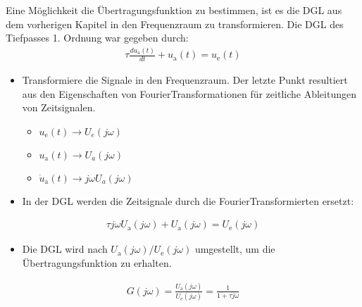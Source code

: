 \documentclass[letterpaper,10pt,english]{jupyterBook}
\begin{document}
\sphinxAtStartPar
{} Eine Möglichkeit die Übertragungsfunktion zu bestimmen, ist es die DGL aus dem vorherigen Kapitel in den Frequenzraum zu transformieren. Die DGL des Tiefpasses 1. Ordnung war gegeben durch:
\begin{equation*}
\begin{split}\tau \frac{du_\mathrm a (t)}{dt} + u_\mathrm a (t) = u_\mathrm e (t)\end{split}
\end{equation*}\begin{itemize}
\item {} 
\sphinxAtStartPar
Transformiere die Signale in den Frequenzraum. Der letzte Punkt resultiert aus den Eigenschaften von Fourier\sphinxhyphen{}Transformationen für zeitliche Ableitungen von Zeitsignalen.
\begin{itemize}
\item {} 
\sphinxAtStartPar
\(u_\mathrm e (t) \rightarrow U_e(j \omega)\)

\item {} 
\sphinxAtStartPar
\(u_\mathrm a (t) \rightarrow U_a(j \omega)\)

\item {} 
\sphinxAtStartPar
\(\dot u_\mathrm a (t) \rightarrow j \omega U_a(j \omega)\)

\end{itemize}

\item {} 
\sphinxAtStartPar
In der DGL werden die Zeitsignale durch die Fourier\sphinxhyphen{}Transformierten ersetzt:

\end{itemize}
\begin{equation*}
\begin{split}\tau j \omega U_\mathrm a(j \omega) + U_\mathrm a (j \omega) = U_\mathrm e (j \omega)\end{split}
\end{equation*}\begin{itemize}
\item {} 
\sphinxAtStartPar
Die DGL wird nach \(U_\mathrm a(j \omega) / U_\mathrm e(j \omega)\) umgestellt, um die Übertragungsfunktion zu erhalten.

\end{itemize}
\begin{equation*}
\begin{split}G(j \omega) = \frac{U_\mathrm a(j \omega)}{U_\mathrm e(j \omega)} = \frac{1}{1+\tau j \omega}\end{split}
\end{equation*}
\end{document}
